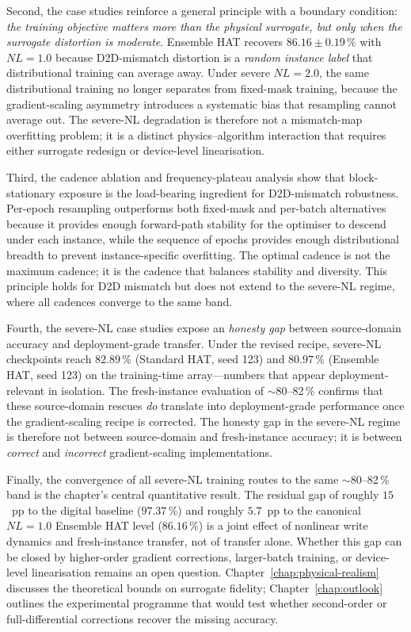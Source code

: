 Second, the case studies reinforce a general principle with a boundary condition: \emph{the training objective matters more than the physical surrogate, but only when the surrogate distortion is moderate}.  Ensemble HAT recovers $86.16\pm0.19\,\%$ with $NL=1.0$ because D2D-mismatch distortion is a \emph{random instance label} that distributional training can average away.  Under severe $NL=2.0$, the same distributional training no longer separates from fixed-mask training, because the gradient-scaling asymmetry introduces a systematic bias that resampling cannot average out.  The severe-NL degradation is therefore not a mismatch-map overfitting problem; it is a distinct physics--algorithm interaction that requires either surrogate redesign or device-level linearisation.

Third, the cadence ablation and frequency-plateau analysis show that block-stationary exposure is the load-bearing ingredient for D2D-mismatch robustness.  Per-epoch resampling outperforms both fixed-mask and per-batch alternatives because it provides enough forward-path stability for the optimiser to descend under each instance, while the sequence of epochs provides enough distributional breadth to prevent instance-specific overfitting.  The optimal cadence is not the maximum cadence; it is the cadence that balances stability and diversity.  This principle holds for D2D mismatch but does not extend to the severe-NL regime, where all cadences converge to the same band.

Fourth, the severe-NL case studies expose an \emph{honesty gap} between source-domain accuracy and deployment-grade transfer.  Under the revised recipe, severe-NL checkpoints reach $82.89\,\%$ (Standard HAT, seed 123) and $80.97\,\%$ (Ensemble HAT, seed 123) on the training-time array---numbers that appear deployment-relevant in isolation.  The fresh-instance evaluation of $\sim$80--82\,\% confirms that these source-domain rescues \emph{do} translate into deployment-grade performance once the gradient-scaling recipe is corrected.  The honesty gap in the severe-NL regime is therefore not between source-domain and fresh-instance accuracy; it is between \emph{correct} and \emph{incorrect} gradient-scaling implementations.

Finally, the convergence of all severe-NL training routes to the same $\sim$80--82\,\% band is the chapter's central quantitative result.  The residual gap of roughly $15$~pp to the digital baseline ($97.37\,\%$) and roughly $5.7$~pp to the canonical $NL=1.0$ Ensemble HAT level ($86.16\,\%$) is a joint effect of nonlinear write dynamics and fresh-instance transfer, not of transfer alone.  Whether this gap can be closed by higher-order gradient corrections, larger-batch training, or device-level linearisation remains an open question.  Chapter~\ref{chap:physical-realism} discusses the theoretical bounds on surrogate fidelity; Chapter~\ref{chap:outlook} outlines the experimental programme that would test whether second-order or full-differential corrections recover the missing accuracy.


